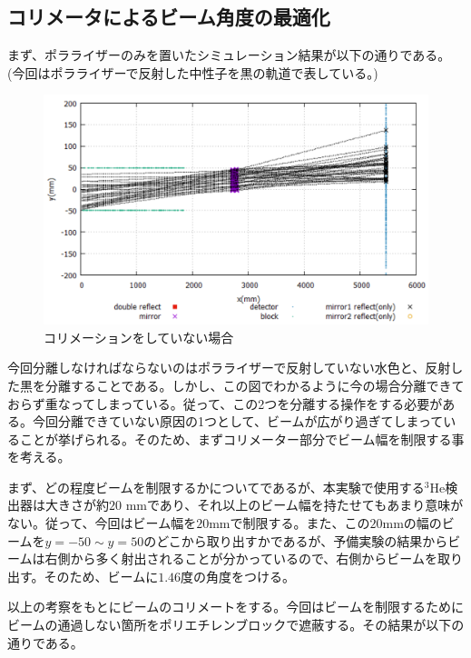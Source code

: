\subsection{コリメータによるビーム角度の最適化}

まず、ポラライザーのみを置いたシミュレーション結果が以下の通りである。(今回はポラライザーで反射した中性子を黒の軌道で表している。)

\begin{figure}[H]
\centering
\includegraphics[keepaspectratio,scale=0.4]{angle/nocolimator.png}
\caption{コリメーションをしていない場合}
\end{figure}

今回分離しなければならないのはポラライザーで反射していない水色と、反射した黒を分離することである。しかし、この図でわかるように今の場合分離できておらず重なってしまっている。従って、この2つを分離する操作をする必要がある。今回分離できていない原因の1つとして、ビームが広がり過ぎてしまっていることが挙げられる。そのため、まずコリメーター部分でビーム幅を制限する事を考える。

まず、どの程度ビームを制限するかについてであるが、本実験で使用する$^3$He検出器は大きさが約$20$ mmであり、それ以上のビーム幅を持たせてもあまり意味がない。従って、今回はビーム幅を$20$mmで制限する。また、この$20$mmの幅のビームを$y=-50 \sim y=50$のどこから取り出すかであるが、予備実験の結果からビームは右側から多く射出されることが分かっているので、右側からビームを取り出す。そのため、ビームに$1.46$度の角度をつける。

以上の考察をもとにビームのコリメートをする。今回はビームを制限するためにビームの通過しない箇所をポリエチレンブロックで遮蔽する。その結果が以下の通りである。

